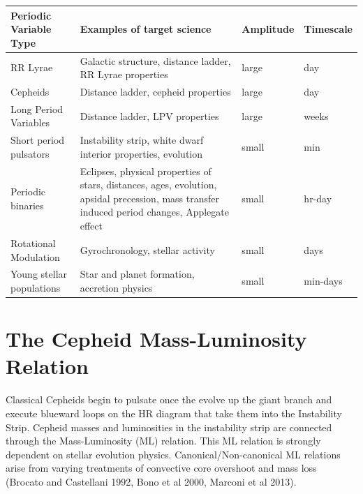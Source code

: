 
\begin{center}
\begin{tabular}{| l | p{8cm} |l | l |}
\hline Periodic Variable Type & Examples of target science & Amplitude & Timescale\\
\hline
RR Lyrae & Galactic structure, distance ladder, RR Lyrae properties&  large &  day \\
Cepheids & Distance ladder, cepheid properties&  large &  day \\
Long Period Variables & Distance ladder, LPV properties & large  &  weeks \\
Short period pulsators & Instability strip, white dwarf interior properties, evolution&  small & min  \\
Periodic binaries & Eclipses, physical properties of stars, distances, ages, evolution, apsidal precession, mass transfer induced period changes, Applegate effect &  small &  hr-day \\
Rotational Modulation & Gyrochronology, stellar activity& small  &  days \\
Young stellar populations & Star and planet formation, accretion physics & small  &  min-days \\
 \hline \end{tabular}
 \end{center}
 
 \section{The Cepheid Mass-Luminosity Relation}

Classical Cepheids begin to pulsate once the evolve up the giant branch and execute blueward loops on the HR diagram that take them 
into the Instability Strip. Cepheid masses and luminosities in the instability strip are connected through the Mass-Luminosity (ML) relation.
This ML relation is strongly dependent on stellar evolution physics. Canonical/Non-canonical ML
relations arise from varying treatments of convective core overshoot and mass loss (Brocato and Castellani 1992, Bono et al 2000,
Marconi et al 2013).

